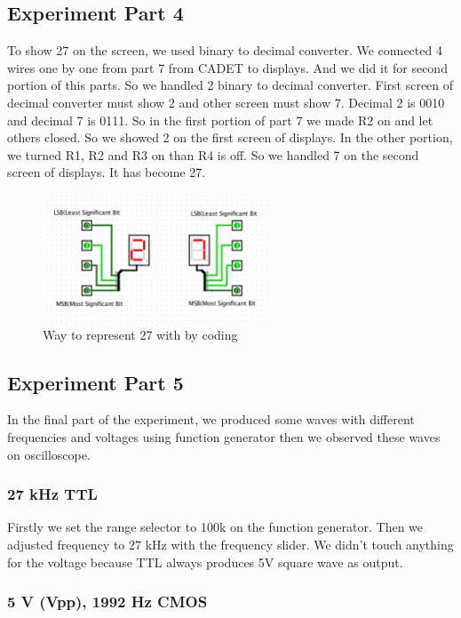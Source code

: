 \documentclass[pdftex,12pt,a4paper]{article}
\begin{document}
\newpage
\subsection{Experiment Part 4}
To show 27 on the screen, we used binary to decimal converter. We connected 4 wires one by one from part 7 from CADET to displays. And we did it for second portion of this parts. So we handled 2 binary to decimal converter. First screen of decimal converter must show 2 and other screen must show 7. Decimal 2 is 0010 and decimal 7 is 0111. So in the first portion of part 7 we made R2 on and let others closed. So we showed 2 on the first screen of displays. In the other portion, we turned R1, R2 and R3 on than R4 is off. So we handled 7 on the second screen of displays. It has become 27.
\begin{figure}[ht]
	\centering
	\includegraphics[width=0.6\textwidth]{27.png}
	\caption{Way to represent 27 with by coding}
	\label{fig3}
\end{figure}

\subsection{Experiment Part 5}

In the final part of the experiment, we produced some waves with different frequencies
and voltages using function generator then we observed these waves on oscilloscope.

\subsubsection{27 kHz TTL}

Firstly we set the range selector to 100k on the function generator. Then we adjusted frequency to 27 kHz with the frequency slider. We didn't touch anything for the voltage because TTL always produces 5V square wave as output.

\subsubsection{5 V (Vpp), 1992 Hz CMOS}
\end{document}
